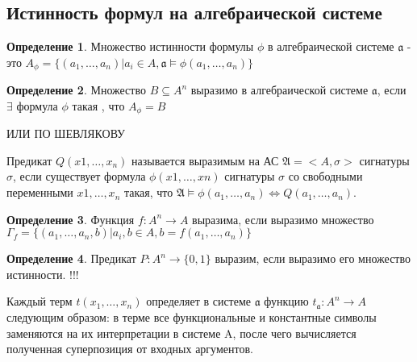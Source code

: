\documentclass[a4paper]{article}
\theoremstyle{definition}
\newtheorem*{definition}{Определение}
\theoremstyle{remark}
\begin{document}
    \subsection{Истинность формул на алгебраической системе}
    \begin{definition}
        Множество истинности формулы $\phi$ в алгебраической системе $\mathfrak{a}$ - это
        $A_\phi = \{(a_1, \dots, a_n) | a_i \in A, \mathfrak{a}\models \phi(a_1, \dots, a_n)\} $
    \end{definition}
    \begin{definition}
        Множество $B\subseteq A^n$ выразимо в алгебраической системе $\mathfrak{a}$, если 
        $\exists$ формула $\phi$ такая , что $A_\phi = B$

        ИЛИ ПО ШЕВЛЯКОВУ
        
        Предикат $Q(x1, \dots , x_n)$ называется выразимым на АС 
        $\mathfrak{A} =<A, \sigma>$ сигнатуры $\sigma$, если существует формула $\phi(x1, \dots , xn)$ сигнатуры $\sigma$ со свободными переменными 
        $x1, \dots , x_n$ такая, что
        $\mathfrak{A} \models \phi(a_1, \dots , a_n) \Leftrightarrow Q(a_1, \dots , a_n).$
    \end{definition}
    \begin{definition}
        Функция $f:A^n \to A$ выразима, если выразимо множество $\Gamma_f = \{ (a_1, \dots, a_n, b) | a_i, b \in A, b = f(a_1, \dots, a_n)\} $
    \end{definition}
    \begin{definition}
        Предикат $P:A^n \to \{ 0, 1\} $ выразим, если выразимо его множество истинности. !!!
    \end{definition}
    Каждый терм $t(x_1,\dots, x_n)$ определяет в системе $\mathfrak{a}$ функцию $t_{\mathfrak{a}}: A^n \rightarrow A$
    следующим образом: в терме все функциональные и 
    константные символы заменяются на их интерпретации в системе A, после чего 
    вычисляется полученная суперпозиция от входных аргументов.
    
\end{document}

